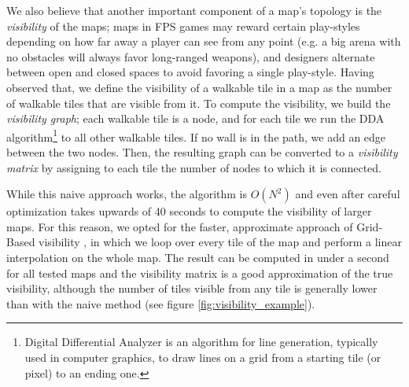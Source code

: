 We also believe that another important component of a map's topology is the \textit{visibility} of the maps; maps in FPS games may reward certain play-styles depending on how far away a player can see from any point (e.g. a big arena with no obstacles will always favor long-ranged weapons), and designers alternate between open and closed spaces to avoid favoring a single play-style. Having observed that, we define the visibility of a walkable tile in a map as the number of walkable tiles that are visible from it. To compute the visibility, we build the \textit{visibility graph}; each walkable tile is a node, and for each tile we run the DDA algorithm\footnote{Digital Differential Analyzer is an algorithm for line generation, typically used in computer graphics, to draw lines on a grid from a starting tile (or pixel) to an ending one.} to all other walkable tiles. If no wall is in the path, we add an edge between the two nodes. Then, the resulting graph can be converted to a \textit{visibility matrix} by assigning to each tile the number of nodes to which it is connected.

While this naive approach works, the algorithm is $O\left(N^{2}\right)$ and even after careful optimization takes upwards of 40 seconds to compute the visibility of larger maps. For this reason, we opted for the faster, approximate approach of Grid-Based visibility \cite{goldstein_quick_2023}, in which we loop over every tile of the map and perform a linear interpolation on the whole map. The result can be computed in under a second for all tested maps and the visibility matrix is a good approximation of the true visibility, although the number of tiles visible from any tile is generally lower than with the naive method (see figure \cref{fig:visibility_example}).

